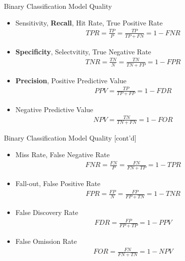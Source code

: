 \documentclass[ignorenonframetext,xcolor=x11names]{beamer}
\begin{document}
\begin{frame}{Binary Classification Model Quality}
\begin{itemize}
   \item Sensitivity, \textbf{Recall}, Hit Rate, True Positive Rate
\begin{align*}
TPR = \frac{TP}{P} = \frac{TP}{TP+FN} = 1 - FNR
\end{align*}
   \item \textbf{Specificity}, Selectvitity, True Negative Rate
\begin{align*}
TNR = \frac{TN}{N} = \frac{TN}{TN+FP} = 1 - FPR
\end{align*}
   \item \textbf{Precision}, Positive Predictive Value
\begin{align*}
PPV = \frac{TP}{TP+FP} = 1 - FDR
\end{align*}
   \item Negative Predictive Value
\begin{align*}
NPV = \frac{TN}{TN+FN} = 1 - FOR
\end{align*}
\end{itemize}
\end{frame}

\begin{frame}{Binary Classification Model Quality \small [cont'd]}
\begin{itemize}
   \item Miss Rate, False Negative Rate
\begin{align*}
FNR = \frac{FN}{P} = \frac{FN}{FN + TP} = 1 - TPR
\end{align*}
   \item Fall-out, False Positive Rate
\begin{align*}
FPR = \frac{FP}{N} = \frac{FP}{FP+TN} = 1 - TNR
\end{align*}
   \item False Discovery Rate
\begin{align*}
FDR = \frac{FP}{FP+TP} = 1 - PPV
\end{align*}
   \item False Omission Rate
\begin{align*}
FOR = \frac{FN}{FN+TN} = 1 - NPV
\end{align*}
\end{itemize}
\end{frame}      
\end{document}
